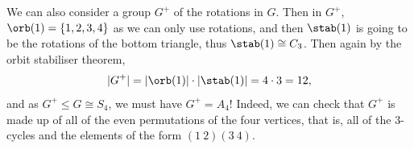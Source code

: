 \documentclass[a4]{scrreprt}
\begin{document}
We can also consider a group $G^+$ of the rotations in $G$. Then in $G^+$, $\orb(1) = \{1, 2, 3, 4\}$ as we can only use rotations, and then $\stab(1)$ is going to be the rotations of the bottom triangle, thus $\stab(1) \cong C_3$. Then again by the orbit stabiliser theorem,
$$
|G^+| = |\orb(1)| \cdot |\stab(1)| = 4 \cdot 3 = 12,
$$
and as $G^+ \leq G \cong S_4$, we must have $G^+ = A_4$!
Indeed, we can check that $G^+$ is made up of all of the even permutations of the four vertices, that is, all of the 3-cycles and the elements of the form $(1\ 2)(3\ 4)$. 
\begin{center}
	


\begin{tikzpicture}[x=0.75pt,y=0.75pt,yscale=-1,xscale=1]


\end{tikzpicture}
\end{center}
\end{document}
